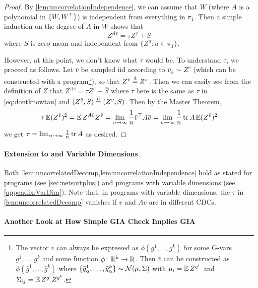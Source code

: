 \documentclass[main.tex]{subfiles}
\begin{document}
\begin{proof}
By \cref{lem:uncorrelationIndependence}, we can assume that $W$ (where $A$ is a polynomial in $\{W,W^{\top}\}$) is independent from everything in $\pi_{1}$. Then a simple induction on the degree of $A$ in $W$ shows that 
\begin{equation}
Z^{Av}=\tau Z^{v}+S\label{eq:dontknowtau}
\end{equation}
 where $S$ is zero-mean and independent from $\{Z^{u}:u\in\pi_{1}\}$.

However, at this point, we don't know what $\tau$ would be. To understand $\tau$, we proceed as follows. Let $\bar{v}$ be sampled iid according to $\bar{v}_{\alpha}\sim Z^{v}$ (which can be constructed with a \netsort{} program\footnote{The vector $v$ can always be expressed as $\phi(g^{1},\ldots,g^{k})$ for some G-vars $g^{1},\ldots,g^{k}$ and some function $\phi:\mathbb{R}^{k}\to\mathbb{R}$. Then $\bar{v}$ can be constructed as $\phi(\bar{g}^{1},\ldots,\bar{g}^{k})$ where $\{\bar{g}_{\alpha}^{1},\ldots,\bar{g}_{\alpha}^{k}\}\sim\mathcal{N}(\mu,\Sigma)$ with $\mu_{i}=\operatorname*{\mathbb{E}} Z^{g^{i}}$ and $\Sigma_{ij}=\operatorname*{\mathbb{E}} Z^{g^{i}}Z^{g^{k}}$.}), so that $Z^{\bar{v}}\overset{\mathrm{d}}{=} Z^{v}$. Then we can easily see from the definition of $Z$ that $Z^{A\bar{v}}=\tau Z^{\bar{v}}+\bar{S}$ where $\tau$ here is the same as $\tau$ in \cref{eq:dontknowtau} and $(Z^{\bar{v}},\bar{S})\overset{\mathrm{d}}{=}(Z^{v},S)$. Then by the Master Theorem,
\[
\tau\operatorname*{\mathbb{E}}(Z^{\bar{v}})^{2}=\operatorname*{\mathbb{E}} Z^{A\bar{v}}Z^{\bar{v}}=\lim_{n\to\infty}\frac{1}{n}\bar{v}^{\top}A\bar{v}=\lim_{n\to\infty}\frac{1}{n}\operatorname{tr} A\operatorname*{\mathbb{E}}(Z^{\bar{v}})^{2}
\]
we get $\tau=\lim_{n\to\infty}\frac{1}{n}\operatorname{tr} A$ as desired.
\end{proof}

\paragraph{Extension to \netsortplus{} and Variable Dimensions}
Both \cref{lem:uncorrelatedDecomp,lem:uncorrelationIndependence} hold as stated for \netsortplus{} programs (see \cref{sec:netsortplus}) and programs with variable dimensions (see \cref{appendix:VarDim}).
Note that, in programs with variable dimensions, the $\tau$ in \cref{lem:uncorrelatedDecomp} vanishes if $v$ and $Av$ are in different CDCs.

\paragraph{Another Look at How Simple GIA Check Implies GIA}
\end{document}
